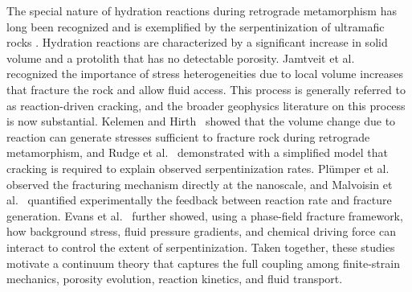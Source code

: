 \documentclass[11pt]{article}
\begin{document}
The special nature of hydration reactions during retrograde metamorphism has long been recognized and is exemplified by the serpentinization of ultramafic rocks \cite{macdonald1985}. Hydration reactions are characterized by a significant increase in solid volume and a protolith that has no detectable porosity. Jamtveit et al.\ \cite{jamtveit2000} recognized the importance of stress heterogeneities due to local volume increases that fracture the rock and allow fluid access. This process is generally referred to as reaction-driven cracking, and the broader geophysics literature on this process is now substantial. Kelemen and Hirth~\cite{kelemen2011reaction} showed that the volume change due to reaction can generate stresses sufficient to fracture rock during retrograde metamorphism, and Rudge et al.~\cite{rudge2010simple} demonstrated with a simplified model that cracking is required to explain observed serpentinization rates. Pl\"umper et al.~\cite{plumper2012serpentine} observed the fracturing mechanism directly at the nanoscale, and Malvoisin et al.~\cite{malvoisin2017serpentinization} quantified experimentally the feedback between reaction rate and fracture generation. Evans et al.~\cite{evans2020phasefield} further showed, using a phase-field fracture framework, how background stress, fluid pressure gradients, and chemical driving force can interact to control the extent of serpentinization. Taken together, these studies motivate a continuum theory that captures the full coupling among finite-strain mechanics, porosity evolution, reaction kinetics, and fluid transport.
\end{document}
